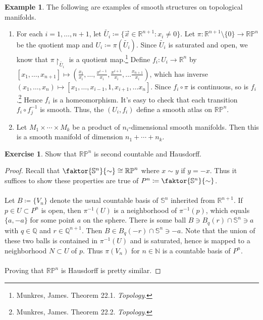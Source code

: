 \documentclass[10pt,letterpaper,cm]{nupset}
\theoremstyle{definition}
\newtheorem{exmp}[definition]{Example}
\theoremstyle{theorem}
\newtheorem{exercise}[definition]{Exercise}
\theoremstyle{remark}
\newcommand{\N}{\mathbb N}
\newcommand{\Q}{\mathbb Q}
\newcommand{\R}{\mathbb R}
\newcommand{\RP}{\mathbb{RP}}
\renewcommand{\S}{\mathbb S}
\newcommand{\1}{\mathbf{1}}
\newcommand{\x}{\vec x}
\newcommand{\0}{\vec 0}
\begin{document}
\begin{exmp}{The following are examples of smooth structures on topological manifolds.}
\begin{enumerate}
\item For each $i = 1, \ldots, n+1$, let $\tilde{U_i}\coloneqq  \{\x \in \R^{n+1} : x_i \ne 0\}$. Let $\pi: \R^{n+1} \setminus\{0\} \to \RP^n$ be the quotient map and $U_i \coloneqq  \pi(\tilde{U_i})$. Since $\tilde{U_i}$ is saturated and open, we know that $\pi \restriction_{\tilde{U_i}}$ is a quotient map.\footnote{Munkres, James. Theorem 22.1. \textit{Topology}.} Define $f_i : U_i \to \R^n$ by $[x_1, \ldots, x_{n+1}] \mapsto (\frac{x_1}{x_i}, \ldots, \frac{x^{i-1}}{x_i}, \frac{x^{i+1}}{x_i}, \ldots \frac{x_{n+1}}{x_i})$, which has inverse $(x_1, \ldots, x_n) \mapsto [x_1, \ldots, x_{i-1}, 1, x_{i+1}, \ldots x_n]$. Since $f_i \circ \pi$ is continuous, so is $f_i$.\footnote{Munkres, James. Theorem 22.2. \textit{Topology}.} Hence $f_i$ is a homeomorphism. It's easy to check that each transition $f_i \circ f_j^{-1}$ is smooth. Thus, the $(U_i, f_i)$ define a smooth atlas on $\RP^n$.
\item Let $M_1 \times \cdots \times M_k$ be a product of $n_i$-dimensional smooth manifolds. Then this is a smooth manifold of dimension $n_1 + \cdots + n_k$.
\end{enumerate}
\end{exmp}

\begin{exercise} 
Show that $\RP^n$ is second countable and Hausdorff. 
\end{exercise}
\begin{proof}
Recall that $\faktor{\S^n}{\sim} \cong \RP^n$ where $x \sim y$ if $y = -x$. Thus it suffices to show these properties are true of $P^n\coloneqq  \faktor{\S^n}{\sim}$. 
\\ \\
Let $B\coloneqq \{V_n\}$ denote the usual countable basis of $\S^n$ inherited from $\R^{n+1}$. If $p\in U\subset P^n$ is open, then $\pi^{-1}(U)$ is a neighborhood of $\pi^{-1}(p)$, which equals $\{a, -a\}$ for some point $a$ on the sphere.  There is some ball $B \ni B_q(r) \cap \S^n \ni a$ with $q\in \Q$ and $r \in \Q^{n+1}$. Then $B \in B_q(-r) \cap \S^n \ni -a$. Note that the union of these two balls is contained in $\pi^{-1}(U)$ and is saturated, hence is mapped to a neighborhood $N \subset U$ of $p$. Thus $\pi(V_n)$ for $n\in \N$ is a countable basis of $P^n$.
\\ \\ Proving that $\RP^n$ is Hausdorff is pretty similar.
\end{proof}
\end{document}
